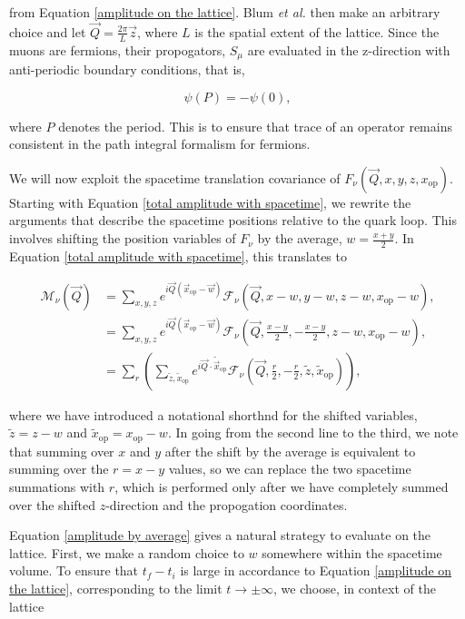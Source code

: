\documentclass{article}
\numberwithin{equation}{section} %
\begin{document}
\noindent from Equation \ref{amplitude on the lattice}. Blum \textit{et al.} then make an arbitrary choice and let $\vec{Q} = \frac{2\pi}{L}\vec{z}$, where $L$ is the spatial extent of the lattice. Since the muons are fermions, their propogators, $S_\mu$ are evaluated in the z-direction with anti-periodic boundary conditions, that is,

\begin{equation}
\psi(P) = -\psi(0),
\end{equation}

\noindent where $P$ denotes the period. This is to ensure that trace of an operator remains consistent in the path integral formalism for fermions\cite{antiperiodic}. 

We will now exploit the spacetime translation covariance of $F_\nu(\vec{Q},x,y,z,x_\mathrm{op})$. Starting with Equation \ref{total amplitude with spacetime}, we rewrite the arguments that describe the spacetime positions relative to the quark loop. This involves shifting the position variables of $F_\nu$ by the average, $w=\frac{x+y}{2}$. In Equation \ref{total amplitude with spacetime}, this translates to

\begin{equation}
\begin{split}
\mathcal{M}_\nu(\vec{Q}) &= \sum_{x,y,z} e^{i\vec{Q}(\vec{x}_\mathrm{op}-\vec{w})} \mathcal{F}_\nu(\vec{Q},x-w,y-w,z-w,x_\mathrm{op}-w), \\
&= \sum_{x,y,z} e^{i\vec{Q}(\vec{x}_\mathrm{op}-\vec{w})} \mathcal{F}_\nu(\vec{Q},\frac{x-y}{2},-\frac{x-y}{2},z-w,x_\mathrm{op}-w),\\
&= \sum_r\left(\sum_{\tilde{z},\tilde{x}_\mathrm{op}} e^{i\vec{Q}\cdot\tilde{\vec{x}}_\mathrm{op}} \mathcal{F}_\nu(\vec{Q},\frac{r}{2},-\frac{r}{2},\tilde{z},\tilde{x}_\mathrm{op})\right),
\end{split}
\label{amplitude by average}
\end{equation}

\noindent where we have introduced a notational shorthnd for the shifted variables, $\tilde{z}=z-w$ and $\tilde{x}_\mathrm{op}=x_\mathrm{op}-w$. In going from the second line to the third, we note that summing over $x$ and $y$ after the shift by the average is equivalent to summing over the $r=x-y$ values, so we can replace the two spacetime summations with $r$, which is performed only after we have completely summed over the shifted $z$-direction and the propogation coordinates.

Equation \ref{amplitude by average} gives a natural strategy to evaluate on the lattice. First, we make a random choice to $w$ somewhere within the spacetime volume. To ensure that $t_f-t_i$ is large in accordance to Equation \ref{amplitude on the lattice}, corresponding to the limit $t\rightarrow \pm \infty$, we choose, in context of the lattice
\end{document}
